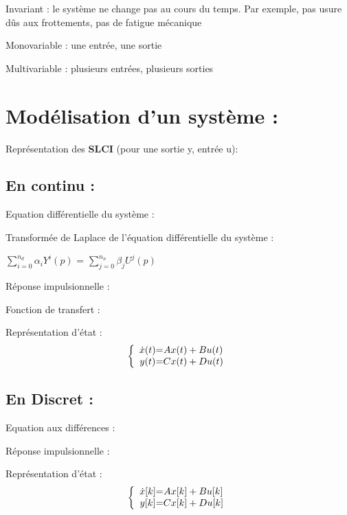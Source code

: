 Invariant : le système ne change pas au cours du temps. Par exemple, pas usure dûs aux frottements, pas de fatigue mécanique \newline

Monovariable : une entrée, une sortie \newline

Multivariable : plusieurs entrées, plusieurs sorties \newpage 

\section{Modélisation d'un système :}
\large{
Représentation des \textbf{SLCI} (pour une sortie y, entrée u):
}
\subsection{En continu : }

Equation différentielle du système :
\begin{center}
\Large{}
\end{center}
Transformée de Laplace de l'équation différentielle du système : 
\begin{center}
\Large{{$\sum_{i=0}^{n_d} \alpha_{i} Y^{i}(p)$} = {$\sum_{j=0}^{n_n} \beta_{j} U^{j}(p)$}}
\end{center}
Réponse impulsionnelle :
\begin{center}
\Large{}     
\end{center}
Fonction de transfert :
\begin{center}
    \Large{}
\end{center}
Représentation d'état : 
\[
\left \{
\begin{array}{c @{=} c}
    \dot x(t) & Ax(t) + Bu(t)\\
    y(t) & Cx(t) + Du(t)
\end{array}
\right.
\]
\subsection{En Discret :}
Equation aux différences :
\begin{center}
\Large{}
\end{center}
Réponse impulsionnelle :
\begin{center}
\Large{}   
\end{center}
Représentation d'état : 
\[
\left \{
\begin{array}{c @{=} c}
    \dot x[k] & Ax[k] + Bu[k]\\
    y[k] & Cx[k] + Du[k]
\end{array}
\right.
\]
\newpage
